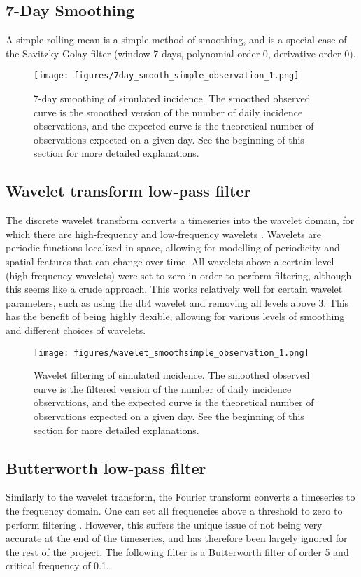 \documentclass{article}
\begin{document}
\subsection{7-Day Smoothing}
A simple rolling mean is a simple method of smoothing, and is a special case of the Savitzky-Golay filter (window 7 days, polynomial order 0, derivative order 0). 

\clearpage
\begin{figure}[h!]
    \centering
    \texttt{[image: figures/7day\_smooth\_simple\_observation\_1.png]}
    \caption{7-day smoothing of simulated incidence. The smoothed observed curve is the smoothed version of the number of daily incidence observations, and the expected curve is the theoretical number of observations expected on a given day. See the beginning of this section for more detailed explanations.} 

\end{figure}


\subsection{Wavelet transform low-pass filter}
The discrete wavelet transform converts a timeseries into the wavelet domain, for which there are high-frequency and low-frequency wavelets . Wavelets are periodic functions localized in space, allowing for modelling of periodicity and spatial features that can change over time. \cite{wavelets} All wavelets above a certain level (high-frequency wavelets) were set to zero in order to perform filtering, although this seems like a crude approach. This works relatively well for certain wavelet parameters, such as using the db4 wavelet and removing all levels above 3. This has the benefit of being highly flexible, allowing for various levels of smoothing and different choices of wavelets. 

\clearpage
\begin{figure}[h!]
    \centering
    \texttt{[image: figures/wavelet\_smoothsimple\_observation\_1.png]}
    \caption{Wavelet filtering of simulated incidence. The smoothed observed curve is the filtered version of the number of daily incidence observations, and the expected curve is the theoretical number of observations expected on a given day. See the beginning of this section for more detailed explanations.}
\end{figure}


\subsection{Butterworth low-pass filter}
Similarly to the wavelet transform, the Fourier transform converts a timeseries to the frequency domain. One can set all frequencies above a threshold to zero to perform filtering \cite{butterworth}. However, this suffers the unique issue of not being very accurate at the end of the timeseries, and has therefore been largely ignored for the rest of the project. The following filter is a Butterworth filter of order 5 and critical frequency of 0.1.
\end{document}
